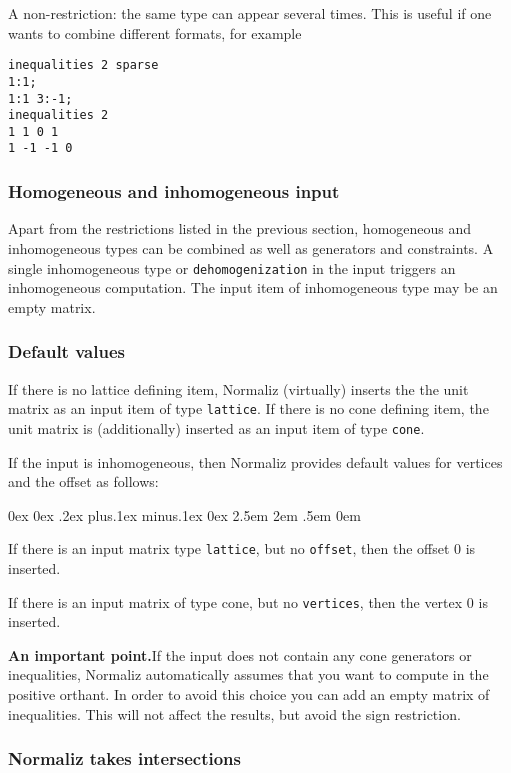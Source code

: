 \documentclass[12pt,a4paper]{scrartcl}
\newcounter{listi}
\newcommand{\stdli}{ \topsep0ex \partopsep0ex %
\parsep.2ex plus.1ex minus.1ex \itemsep0ex%
\leftmargin2.5em \labelwidth2em \labelsep.5em \rightmargin0em}%
\newenvironment{arab}{\begin{list}{\textup{(\arabic{listi})}}%
	{\usecounter{listi}\stdli}}{\end{list}}
\theoremstyle{definition}
\def\ttt{\texttt}
\begin{document}
A non-restriction: the same type can appear several times. This is useful if one wants to combine different formats, for example
\begin{Verbatim}
inequalities 2 sparse
1:1;
1:1 3:-1;
inequalities 2
1 1 0 1
1 -1 -1 0
\end{Verbatim}

\subsubsection{Homogeneous and inhomogeneous input}\label{inhom_inp}

Apart from the restrictions listed in the previous section, homogeneous and inhomogeneous types can be combined as well as generators and constraints. A single inhomogeneous type or \verb|dehomogenization| in the input triggers an inhomogeneous computation. The input item of inhomogeneous type may be an empty matrix.

\subsubsection{Default values}\label{default}

If there is no lattice defining item, Normaliz (virtually) inserts the the unit matrix as an input item of type \ttt{lattice}. If there is no cone defining item, the unit matrix is (additionally) inserted as an input item of type \ttt{cone}.

If the input is inhomogeneous, then Normaliz provides default values for vertices and the offset as follows:
\begin{arab}
	\item If there is an input matrix type \verb|lattice|, but no \ttt{offset}, then the offset $0$ is inserted.
	\item If there is an input matrix of type cone, but no \ttt{vertices}, then the vertex $0$ is inserted. 
\end{arab}

\textbf{An important point.}\enspace If the input does not contain any cone generators or inequalities, Normaliz automatically assumes that you want to compute in the positive orthant. In order to avoid this choice you can add an empty matrix of inequalities. This will not affect the results, but avoid the sign restriction.



\subsubsection{Normaliz takes intersections}
\end{document}
